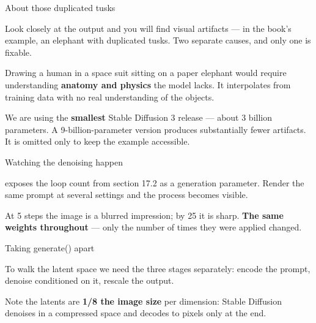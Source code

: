 \documentclass[aspectratio=169,11pt,t]{beamer}
\begin{document}
\begin{frame}[shrink=25]{About those duplicated tusks}
{\fontsize{9.4}{12.6}\selectfont\color{fg2}Look closely at the output and you will find visual artifacts --- in the book's example, an elephant with duplicated tusks. Two separate causes, and only one is fixable.\par}\vskip 4pt
\begin{minipage}[t]{0.494\textwidth}
\begin{icardwarn}
Drawing a human in a space suit sitting on a paper elephant would require understanding \textbf{anatomy and physics} the model lacks. It interpolates from training data with no real understanding of the objects.
\end{icardwarn}
\end{minipage}%
\hfill
\begin{minipage}[t]{0.494\textwidth}
\begin{icardgood}
We are using the \textbf{smallest} Stable Diffusion 3 release --- about 3 billion parameters. A 9-billion-parameter version produces substantially fewer artifacts. It is omitted only to keep the example accessible.
\end{icardgood}
\end{minipage}%
\end{frame}

\begin{frame}[shrink=25]{Watching the denoising happen}
{\fontsize{9.4}{12.6}\selectfont\color{fg2} exposes the loop count from section 17.2 as a generation parameter. Render the same prompt at several settings and the process becomes visible.\par}\vskip 4pt
{\fontsize{9.4}{12.6}\selectfont\color{fg2}At 5 steps the image is a blurred impression; by 25 it is sharp. \textbf{The same weights throughout} --- only the number of times they were applied changed.\par}\vskip 4pt
\end{frame}

\begin{frame}[shrink=25]{Taking generate() apart}
{\fontsize{9.4}{12.6}\selectfont\color{fg2}To walk the latent space we need the three stages separately: encode the prompt, denoise conditioned on it, rescale the output.\par}\vskip 4pt
{\fontsize{9.4}{12.6}\selectfont\color{fg2}Note the latents are \textbf{1/8 the image size} per dimension: Stable Diffusion denoises in a compressed space and decodes to pixels only at the end.\par}\vskip 4pt
\end{frame}
\end{document}
